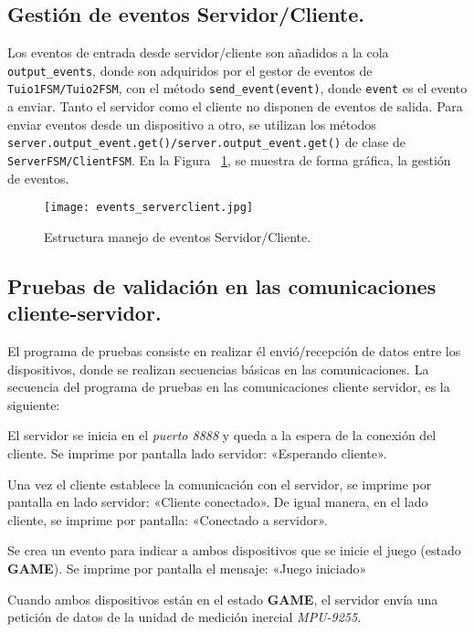 \subsection{Gestión de eventos Servidor/Cliente.}
Los eventos de entrada desde servidor/cliente son añadidos a la cola \texttt{output\_events}, donde son adquiridos por el gestor de eventos de \texttt{Tuio1FSM/Tuio2FSM}, con el método \texttt{send\_event(event)}, donde \texttt{event} es el evento a enviar.
Tanto el servidor como el cliente no disponen de eventos de salida. Para enviar eventos desde un dispositivo a otro, se utilizan los métodos \texttt{server.output\_event.get()/server.output\_event.get()} de clase de \texttt{ServerFSM/ClientFSM}. En la Figura ~\ref{fig:events_serverclient}, se muestra de forma gráfica, la gestión de eventos.
\begin{figure}[!h]
\begin{center}
\texttt{[image: events\_serverclient.jpg]}
\caption{Estructura manejo de eventos Servidor/Cliente.}
\label{fig:events_serverclient}
\end{center}
\end{figure}


\subsection{Pruebas de validación en las comunicaciones cliente-servidor.}

El programa de pruebas consiste en realizar él envió/recepción de datos entre los dispositivos, donde se realizan secuencias básicas en las comunicaciones.
La secuencia del programa de pruebas en las comunicaciones cliente servidor, es la siguiente:

El servidor se inicia en el \emph{puerto 8888} y queda a la espera de la conexión del cliente. Se imprime por pantalla lado servidor: «Esperando cliente». 

Una vez el cliente establece la comunicación con el servidor, se imprime por pantalla en lado servidor: «Cliente conectado». De igual manera, en el lado cliente, se imprime por pantalla: «Conectado a servidor».

Se crea un evento para indicar a ambos dispositivos que se inicie el juego (estado \textbf{GAME}). Se imprime por pantalla el mensaje: «Juego iniciado»

Cuando ambos dispositivos están en el estado \textbf{GAME}, el servidor envía una petición de datos de la unidad de medición inercial \emph{MPU-9255}.

